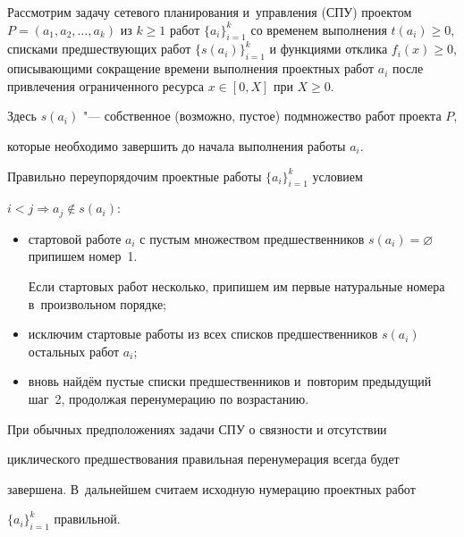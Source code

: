 
Рассмотрим задачу сетевого планирования и~уп\-рав\-ле\-ния (СПУ) проектом $P=(a_1, a_2, \dots, a_k)$ из $k\geq1$ работ $\{a_i\}^{k}_{i=1}$ со временем выполнения $t(a_i)\geq0$, списками  предшествующих работ $\{{s(a_i)}\}^{k}_{i=1}$ и функциями отклика $f_i(x)\geq0$, описывающими сокращение времени выполнения проектных работ $a_i$ после привлечения ограниченного ресурса $x\in[0, X]$ при $X\geq0$.

Здесь $s(a_i)$ "--- собственное (возможно, пустое) подмножество работ проекта $P$, 

которые необходимо завершить до начала выполнения работы $a_i$.






Правильно переупорядочим проектные работы $\{a_i\}^{k}_{i=1}$ условием

$i<j\Rightarrow a_{j}\notin s(a_i)$:

\begin{itemize}

\item[1)] стартовой работе $a_i$ с пустым множеством предшественников $s(a_i)=\varnothing$ припишем номер~1. 

Если стартовых работ несколько, припишем им первые натуральные номера в~произвольном порядке;



\item[2)] исключим стартовые работы из всех списков предшественников $s(a_i)$ остальных работ $a_i$;



\item[3)] вновь найдём пустые списки предшественников и~повторим предыдущий шаг~2, продолжая перенумерацию по возрастанию.

\end{itemize}



При обычных  предположениях задачи СПУ о связности и отсутствии

циклического предшествования правильная перенумерация всегда будет

завершена. В~дальнейшем считаем исходную нумерацию проектных работ

$\{a_i\}^{k}_{i=1}$ правильной.





